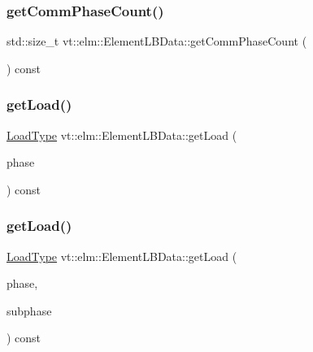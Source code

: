 \mbox{\label{structvt_1_1elm_1_1_element_l_b_data_a5164aaf6b9aa619465454b7d24273f10}} 
\subsubsection{\texorpdfstring{get\+Comm\+Phase\+Count()}{getCommPhaseCount()}}
{\footnotesize\ttfamily std\+::size\+\_\+t vt\+::elm\+::\+Element\+L\+B\+Data\+::get\+Comm\+Phase\+Count (\begin{DoxyParamCaption}{ }\end{DoxyParamCaption}) const}

\mbox{\label{structvt_1_1elm_1_1_element_l_b_data_a839f0515eda6316ee2d6e64bb145e1f4}} 
\subsubsection{\texorpdfstring{get\+Load()}{getLoad()}\hspace{0.1cm}{\footnotesize\ttfamily [1/2]}}
{\footnotesize\ttfamily \hyperlink{namespacevt_a8fb51741340b87d7aaee0bef60e9896b}{Load\+Type} vt\+::elm\+::\+Element\+L\+B\+Data\+::get\+Load (\begin{DoxyParamCaption}\item[{\hyperlink{namespacevt_a46ce6733d5cdbd735d561b7b4029f6d7}{Phase\+Type} const \&}]{phase }\end{DoxyParamCaption}) const}

\mbox{\label{structvt_1_1elm_1_1_element_l_b_data_abbc3c3c8a7c969b0a291f25b8e0d0a62}} 
\subsubsection{\texorpdfstring{get\+Load()}{getLoad()}\hspace{0.1cm}{\footnotesize\ttfamily [2/2]}}
{\footnotesize\ttfamily \hyperlink{namespacevt_a8fb51741340b87d7aaee0bef60e9896b}{Load\+Type} vt\+::elm\+::\+Element\+L\+B\+Data\+::get\+Load (\begin{DoxyParamCaption}\item[{\hyperlink{namespacevt_a46ce6733d5cdbd735d561b7b4029f6d7}{Phase\+Type}}]{phase,  }\item[{\hyperlink{namespacevt_ae78cbfdf1e57470e33eedb074f2beeba}{Subphase\+Type}}]{subphase }\end{DoxyParamCaption}) const}


